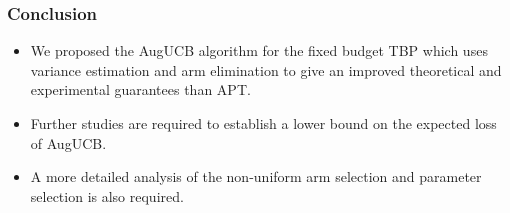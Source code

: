 \begin{frame}
\frametitle{Conclusion}
\begin{itemize}
\item<1-> We proposed the AugUCB algorithm for the fixed budget TBP  which uses variance estimation and arm elimination to give an improved theoretical and experimental guarantees than APT.
\item<2-> Further studies are required to establish a lower bound on the expected loss of AugUCB.
\item<3-> A more detailed analysis of the non-uniform arm selection and parameter selection is also required.
\end{itemize}
\end{frame}


%
